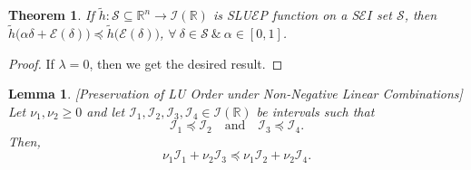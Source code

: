 \documentclass[12pt, reqno]{amsart}
\newtheorem{theorem}{Theorem}[section]
\newtheorem{lemma}{Lemma}[section]
\theoremstyle{definition}
\theoremstyle{remark}
\numberwithin{equation}{section}
\begin{document}
    
     \begin{theorem}
    		If $\tilde{h}:{\mathcal{S}}\subseteq \mathbb{R}^{n}\rightarrow \mathcal{I}(\mathbb{R})$ is SLU$\mathcal{E}$P function on a S$\mathcal{E}I$ set ${\mathcal{S}}$, then $\tilde{h}\big({\alpha}\mathit{\delta} + {\mathcal{E}} (\mathit{\delta} )\big)\preceq\tilde{h}\big({\mathcal{E}} (\mathit{\delta} )\big)$, $\forall~\mathit{\delta} \in {\mathcal{S}}~\&~ {\alpha}\in {[0,1]}$.  
    \end{theorem}
    \begin{proof}
    	
    	If ${\lambda}=0$, then we get the desired result.   
    \end{proof}
    \begin{lemma}\label{lemma 3.1 p4}[Preservation of LU Order under Non-Negative Linear Combinations]
Let $\nu_1, \nu_2 \geq 0$ and let $\mathcal{I}_1, \mathcal{I}_2, \mathcal{I}_3, \mathcal{I}_4 \in \mathcal{I}(\mathbb{R})$ be intervals such that
\[
\mathcal{I}_1 \preceq \mathcal{I}_2 \quad \text{and} \quad \mathcal{I}_3 \preceq \mathcal{I}_4.
\]
Then,
\[
\nu_1 \mathcal{I}_1 + \nu_2 \mathcal{I}_3 \preceq \nu_1 \mathcal{I}_2 + \nu_2 \mathcal{I}_4.
\]
\end{lemma}
\end{document}
